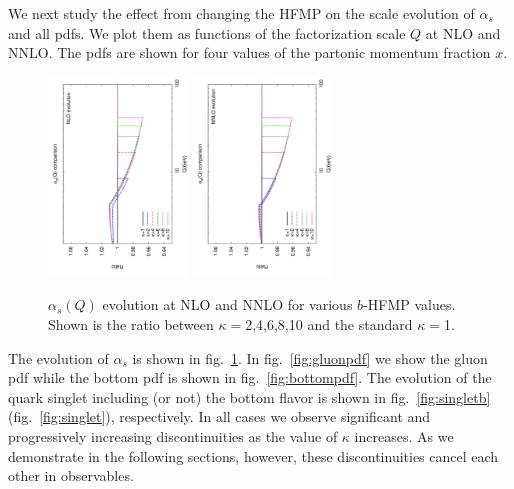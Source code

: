 \documentclass[letter,11pt]{article}
\def\as{\alpha_s}
\def\k{\kappa}
\begin{document}
We next study the effect from changing the HFMP on the scale evolution of $\as$ and all pdfs. We plot them as functions of the factorization scale $Q$ at NLO and NNLO. The pdfs are shown for four values of the partonic momentum fraction $x$.
%
\begin{figure}[t]
\centering
\includegraphics[width=0.33\textwidth,angle=-90]{./alphas_nlo.pdf}
\includegraphics[width=0.33\textwidth,angle=-90]{./alphas_nnlo.pdf}
\caption{$\alpha_s(Q)$ evolution at NLO and NNLO for various $b$-HFMP values. Shown is the ratio between $\k=$2,4,6,8,10 and the standard $\k=$1.}
\label{fig:alphas}
\end{figure}
%

The evolution of $\as$ is shown in fig.~\ref{fig:alphas}. In fig.~\ref{fig:gluonpdf} we show the gluon pdf while the bottom pdf is shown in fig.~\ref{fig:bottompdf}. The evolution of the quark singlet including (or not) the bottom flavor is shown in fig.~\ref{fig:singletb} (fig.~\ref{fig:singlet}), respectively. In all cases we observe significant and progressively increasing discontinuities as the value of $\k$ increases. As we demonstrate in the following sections, however, these discontinuities cancel each other in observables. 
\end{document}

